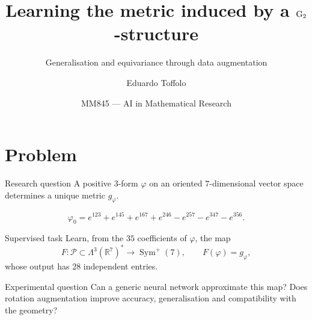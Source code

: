 \documentclass[aspectratio=169,11pt]{beamer}
\title[Learning the metric of a \texorpdfstring{$\Gtwo$}{G2}-structure]
{\texorpdfstring{Learning the metric induced by a $\Gtwo$-structure}
{Learning the metric induced by a G2-structure}}
\subtitle{Generalisation and equivariance through data augmentation}
\author[Eduardo Toffolo]{Eduardo Toffolo}
\institute[Unicamp]{University of Campinas}
\date{MM845 --- AI in Mathematical Research}
\newcommand{\R}{\mathbb{R}}
\newcommand{\Sym}{\operatorname{Sym}}
\begin{document}
\begin{frame}
    \titlepage
\end{frame}

\section{Problem}

\begin{frame}{Research question}
    \small
    A positive $3$-form $\varphi$ on an oriented $7$-dimensional vector space
    determines a unique metric $g_\varphi$.

    \vspace{-0.10cm}
    \begin{equation*}
        \varphi_0=e^{123}+e^{145}+e^{167}+e^{246}
        -e^{257}-e^{347}-e^{356}.
    \end{equation*}

    \begin{block}{Supervised task}
        Learn, from the $35$ coefficients of $\varphi$, the map
        \begin{equation*}
            F:\mathcal P\subset\Lambda^3(\R^7)^*
            \longrightarrow \Sym^+(7),
            \qquad F(\varphi)=g_\varphi,
        \end{equation*}
        whose output has $28$ independent entries.
    \end{block}

    \begin{alertblock}{Experimental question}
        Can a generic neural network approximate this map? Does rotation augmentation
        improve accuracy, generalisation and compatibility with the geometry?
    \end{alertblock}
\end{frame}
\end{document}
